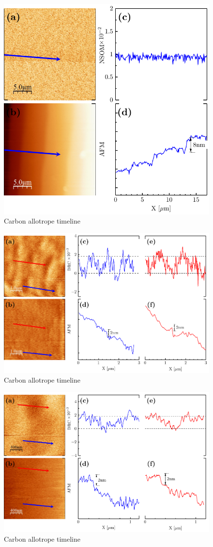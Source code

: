 \begin{figure}
	\centering
	\includegraphics[width=0.75\linewidth]{FIGURES/Experimental_results/FG271.pdf}
	\caption{Carbon allotrope timeline}
	\label{fig:FG271}
\end{figure}

\begin{figure}
	\centering
	\includegraphics[width=0.75\linewidth]{FIGURES/Experimental_results/FG944-01.pdf}
	\caption{Carbon allotrope timeline}
	\label{fig:FG944-01}
\end{figure}

\begin{figure}
	\centering
	\includegraphics[width=0.75\linewidth]{FIGURES/Experimental_results/FG944-02.pdf}
	\caption{Carbon allotrope timeline}
	\label{fig:FG944-02}
\end{figure}

